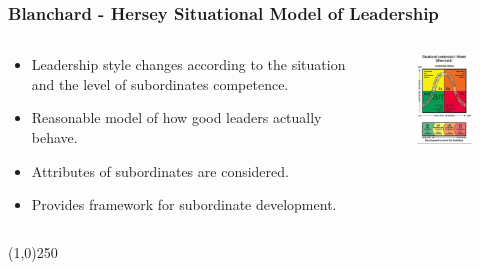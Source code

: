  
\begin{frame}
\frametitle{Blanchard - Hersey Situational Model of Leadership}
\begin{columns}
			\begin{column}{0.5\textwidth}
				\begin{itemize}
					\item Leadership style changes according to the situation and the level of subordinates competence.
					\item Reasonable model of how good leaders actually behave.
					\item Attributes of subordinates are considered.
					\item Provides framework for subordinate development.
				\end{itemize}
			\end{column}

			\begin{column}{0.5\textwidth}
				\begin{figure}
					\centering
						\includegraphics[width = 4cm]{images/bh.jpg}
					\label{fig:blanchard}
				\end{figure}
			\end{column}
\end{columns}
\end{frame}\begin{center}\line(1,0){250}\end{center}



